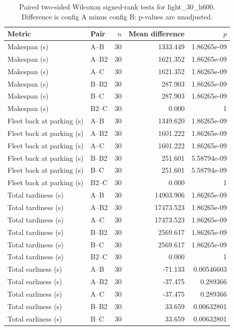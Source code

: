 \begin{table}[t]
\centering
\caption{Paired two-sided Wilcoxon signed-rank tests for light\_30\_h600. Difference is config A minus config B; p-values are unadjusted.}
\label{tab:light-30-h600-paired}
\begin{tabular}{llrrr}
\toprule
Metric & Pair & $n$ & Mean difference & $p$ \\
\midrule
Makespan (s) & A--B & 30 & 1333.449 & 1.86265e-09 \\
Makespan (s) & A--B2 & 30 & 1621.352 & 1.86265e-09 \\
Makespan (s) & A--C & 30 & 1621.352 & 1.86265e-09 \\
Makespan (s) & B--B2 & 30 & 287.903 & 1.86265e-09 \\
Makespan (s) & B--C & 30 & 287.903 & 1.86265e-09 \\
Makespan (s) & B2--C & 30 & 0.000 & 1 \\
Fleet back at parking (s) & A--B & 30 & 1349.620 & 1.86265e-09 \\
Fleet back at parking (s) & A--B2 & 30 & 1601.222 & 1.86265e-09 \\
Fleet back at parking (s) & A--C & 30 & 1601.222 & 1.86265e-09 \\
Fleet back at parking (s) & B--B2 & 30 & 251.601 & 5.58794e-09 \\
Fleet back at parking (s) & B--C & 30 & 251.601 & 5.58794e-09 \\
Fleet back at parking (s) & B2--C & 30 & 0.000 & 1 \\
Total tardiness (s) & A--B & 30 & 14903.906 & 1.86265e-09 \\
Total tardiness (s) & A--B2 & 30 & 17473.523 & 1.86265e-09 \\
Total tardiness (s) & A--C & 30 & 17473.523 & 1.86265e-09 \\
Total tardiness (s) & B--B2 & 30 & 2569.617 & 1.86265e-09 \\
Total tardiness (s) & B--C & 30 & 2569.617 & 1.86265e-09 \\
Total tardiness (s) & B2--C & 30 & 0.000 & 1 \\
Total earliness (s) & A--B & 30 & -71.133 & 0.00546603 \\
Total earliness (s) & A--B2 & 30 & -37.475 & 0.289366 \\
Total earliness (s) & A--C & 30 & -37.475 & 0.289366 \\
Total earliness (s) & B--B2 & 30 & 33.659 & 0.00632801 \\
Total earliness (s) & B--C & 30 & 33.659 & 0.00632801 \\

\end{tabular}
\end{table}
